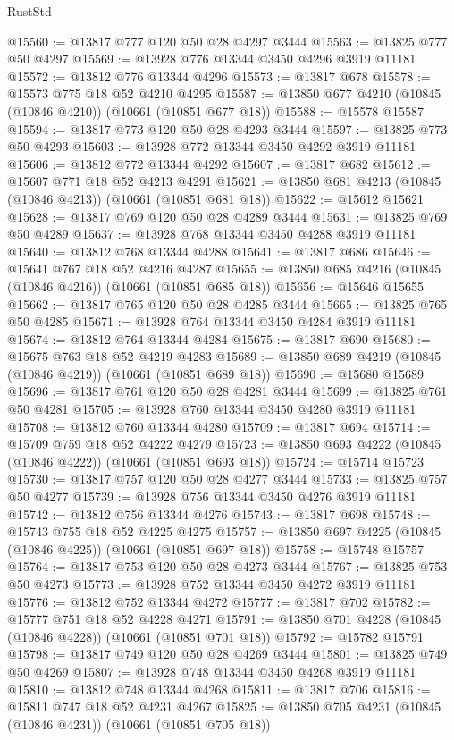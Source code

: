\begin{lexlean}{RustStd}
\begin{coremodule}
@15560 := @13817 @777 @120 @50 @28 @4297 @3444
@15563 := @13825 @777 @50 @4297
@15569 := @13928 @776 @13344 @3450 @4296 @3919 @11181
@15572 := @13812 @776 @13344 @4296
@15573 := @13817 @678
@15578 := @15573 @775 @18 @52 @4210 @4295
@15587 := @13850 @677 @4210 (@10845 (@10846 @4210)) (@10661 (@10851 @677 @18))
@15588 := @15578 @15587
@15594 := @13817 @773 @120 @50 @28 @4293 @3444
@15597 := @13825 @773 @50 @4293
@15603 := @13928 @772 @13344 @3450 @4292 @3919 @11181
@15606 := @13812 @772 @13344 @4292
@15607 := @13817 @682
@15612 := @15607 @771 @18 @52 @4213 @4291
@15621 := @13850 @681 @4213 (@10845 (@10846 @4213)) (@10661 (@10851 @681 @18))
@15622 := @15612 @15621
@15628 := @13817 @769 @120 @50 @28 @4289 @3444
@15631 := @13825 @769 @50 @4289
@15637 := @13928 @768 @13344 @3450 @4288 @3919 @11181
@15640 := @13812 @768 @13344 @4288
@15641 := @13817 @686
@15646 := @15641 @767 @18 @52 @4216 @4287
@15655 := @13850 @685 @4216 (@10845 (@10846 @4216)) (@10661 (@10851 @685 @18))
@15656 := @15646 @15655
@15662 := @13817 @765 @120 @50 @28 @4285 @3444
@15665 := @13825 @765 @50 @4285
@15671 := @13928 @764 @13344 @3450 @4284 @3919 @11181
@15674 := @13812 @764 @13344 @4284
@15675 := @13817 @690
@15680 := @15675 @763 @18 @52 @4219 @4283
@15689 := @13850 @689 @4219 (@10845 (@10846 @4219)) (@10661 (@10851 @689 @18))
@15690 := @15680 @15689
@15696 := @13817 @761 @120 @50 @28 @4281 @3444
@15699 := @13825 @761 @50 @4281
@15705 := @13928 @760 @13344 @3450 @4280 @3919 @11181
@15708 := @13812 @760 @13344 @4280
@15709 := @13817 @694
@15714 := @15709 @759 @18 @52 @4222 @4279
@15723 := @13850 @693 @4222 (@10845 (@10846 @4222)) (@10661 (@10851 @693 @18))
@15724 := @15714 @15723
@15730 := @13817 @757 @120 @50 @28 @4277 @3444
@15733 := @13825 @757 @50 @4277
@15739 := @13928 @756 @13344 @3450 @4276 @3919 @11181
@15742 := @13812 @756 @13344 @4276
@15743 := @13817 @698
@15748 := @15743 @755 @18 @52 @4225 @4275
@15757 := @13850 @697 @4225 (@10845 (@10846 @4225)) (@10661 (@10851 @697 @18))
@15758 := @15748 @15757
@15764 := @13817 @753 @120 @50 @28 @4273 @3444
@15767 := @13825 @753 @50 @4273
@15773 := @13928 @752 @13344 @3450 @4272 @3919 @11181
@15776 := @13812 @752 @13344 @4272
@15777 := @13817 @702
@15782 := @15777 @751 @18 @52 @4228 @4271
@15791 := @13850 @701 @4228 (@10845 (@10846 @4228)) (@10661 (@10851 @701 @18))
@15792 := @15782 @15791
@15798 := @13817 @749 @120 @50 @28 @4269 @3444
@15801 := @13825 @749 @50 @4269
@15807 := @13928 @748 @13344 @3450 @4268 @3919 @11181
@15810 := @13812 @748 @13344 @4268
@15811 := @13817 @706
@15816 := @15811 @747 @18 @52 @4231 @4267
@15825 := @13850 @705 @4231 (@10845 (@10846 @4231)) (@10661 (@10851 @705 @18))

\end{coremodule}
\end{lexlean}
